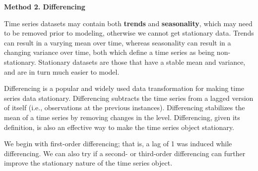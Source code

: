 \documentclass[11pt]{article}
\begin{document}
    \textbf{Method 2. Differencing}

Time series datasets may contain both \textbf{trends} and
\textbf{seasonality}, which may need to be removed prior to modeling,
otherwise we cannot get stationary data. Trends can result in a varying
mean over time, whereas seasonality can result in a changing variance
over time, both which define a time series as being non-stationary.
Stationary datasets are those that have a stable mean and variance, and
are in turn much easier to model.

Differencing is a popular and widely used data transformation for making
time series data stationary. Differencing subtracts the time series from
a lagged version of itself (i.e., observations at the previous
instances). Differencing stabilizes the mean of a time series by
removing changes in the level. Differencing, given its definition, is
also an effective way to make the time series object stationary.

We begin with first-order differencing; that is, a lag of 1 was induced
while differencing. We can also try if a second- or third-order
differencing can further improve the stationary nature of the time
series object.
\end{document}
